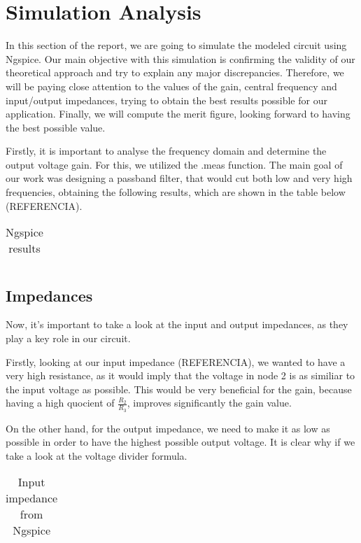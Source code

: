 \section{Simulation Analysis}

In this section of the report, we are going to simulate the modeled circuit using Ngspice. Our main objective with this simulation is confirming the validity of our theoretical approach and try to explain any major discrepancies. Therefore, we will be paying close attention to the values of the gain, central frequency and input/output impedances, trying to obtain the best results possible for our application. Finally, we will compute the merit figure, looking forward to having the best possible value.

Firstly, it is important to analyse the frequency domain and determine the output voltage gain. For this, we utilized the .meas function.
The main goal of our work was designing a passband filter, that would cut both low and very high frequencies, obtaining the following results, which are shown in the table below (REFERENCIA).

\begin{table}[H]
\centering
\begin{tabularx}{0.6\textwidth} {
  | >{\raggedright\arraybackslash}X
  | >{\raggedleft\arraybackslash}X | }
 \hline

\end{tabularx}
\caption{Ngspice results}
\end{table}

\subsection{Impedances}

Now, it's important to take a look at the input and output impedances, as they play a key role in our circuit.

Firstly, looking at our input impedance (REFERENCIA), we wanted to have a very high resistance, as it would imply that the voltage in node 2 is as similiar to the input voltage as possible. This would be very beneficial for the gain, because having a high quocient of $\frac{R_2}{R_3}$, improves significantly the gain value.

On the other hand, for the output impedance, we need to make it as low as possible in order to have the highest possible output voltage. It is clear why if we take a look at the voltage divider formula.

\begin{table}[H]
\centering
\begin{tabularx}{0.6\textwidth} {
  | >{\raggedright\arraybackslash}X
  | >{\raggedleft\arraybackslash}X | }
 \hline

\end{tabularx}
\caption{Input impedance from Ngspice}
\end{table}

